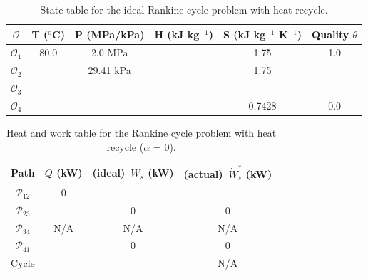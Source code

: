 {    \clearpage
    
    \begin{table}[!ht]
      \centering
      \caption{State table for the ideal Rankine cycle problem with heat recycle.}\label{tbl-rankine-simple-state}
    
      \renewcommand{\arraystretch}{2.0}
      \setlength{\tabcolsep}{14pt}
      \begin{tabular}{c|c|c|c|c|c}\toprule
      $\mathcal{O}$ & T ($^{\mathrm{o}}$C) & P (MPa/kPa) & H (kJ kg$^{-1}$) & S (kJ kg$^{-1}$ K$^{-1}$) & Quality $\theta$ \\ \bottomrule
      $\mathcal{O}_{1}$ & 80.0 & 2.0 MPa & & 1.75 & 1.0 \\ \hline
      $\mathcal{O}_{2}$ &  & 29.41 kPa &  & 1.75 &  \\ \hline
      $\mathcal{O}_{3}$ & & & & & \\ \hline
      $\mathcal{O}_{4}$ & & & & 0.7428 & 0.0 \\ \bottomrule
      \end{tabular}
    \end{table}
    
    \clearpage
    
    \begin{table}[!ht]
      \centering
      \caption{Heat and work table for the Rankine cycle problem with heat recycle ($\alpha$ = 0).}\label{tbl-rankine-simple-work}
    
      \renewcommand{\arraystretch}{2.0}
      \setlength{\tabcolsep}{14pt}
      \begin{tabular}{c|c|c|c}\toprule
      Path & $\dot{Q}$ (kW) & (ideal)~$\dot{W}_{s}$ (kW) & (actual)~$\dot{W}^{*}_{s}$ (kW)\\ \bottomrule
      $\mathcal{P}_{12}$ & 0 & &  \\\hline
      $\mathcal{P}_{23}$ &  & 0 & 0 \\\hline
      $\mathcal{P}_{34}$ & N/A & N/A & N/A \\\hline
      $\mathcal{P}_{41}$ &  & 0 & 0 \\\bottomrule
      Cycle & & & N/A \\\bottomrule
      \end{tabular}
    \end{table}
      
    \clearpage
    }    